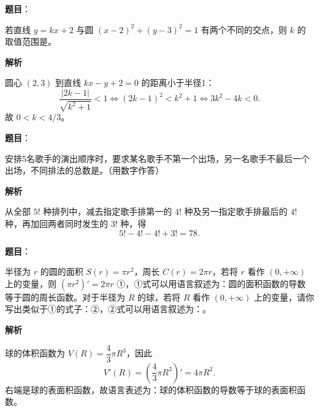 \begin{answer}

\textbf{题目}：

若直线 $y=kx+2$ 与圆 $(x-2)^2+(y-3)^2=1$ 有两个不同的交点，则 $k$ 的取值范围是\gkblank{}。

\textbf{解析}

圆心 $(2,3)$ 到直线 $kx-y+2=0$ 的距离小于半径1：
\nopagebreak[4]
\[
\frac{|2k-1|}{\sqrt{k^2+1}}<1
\iff (2k-1)^2<k^2+1
\iff 3k^2-4k<0.
\]
故 $0<k<4/3$。


\end{answer}
\begin{answer}

\textbf{题目}：

安排5名歌手的演出顺序时，要求某名歌手不第一个出场，另一名歌手不最后一个出场，不同排法的总数是\gkblank{}。（用数字作答）

\textbf{解析}

从全部 $5!$ 种排列中，减去指定歌手排第一的 $4!$ 种及另一指定歌手排最后的 $4!$ 种，再加回两者同时发生的 $3!$ 种，得
\nopagebreak[4]
\[
5!-4!-4!+3!=78.
\]


\end{answer}
\begin{answer}

\textbf{题目}：

半径为 $r$ 的圆的面积 $S(r)=\pi r^2$，周长 $C(r)=2\pi r$，若将 $r$ 看作 $(0,+\infty)$ 上的变量，则 $(\pi r^2)'=2\pi r$ ①，①式可以用语言叙述为：圆的面积函数的导数等于圆的周长函数。对于半径为 $R$ 的球，若将 $R$ 看作 $(0,+\infty)$ 上的变量，请你写出类似于①的式子：\gkblank{}②，②式可以用语言叙述为：\gkblank{}。

\textbf{解析}

球的体积函数为 $V(R)=\dfrac43\pi R^3$，因此
\nopagebreak[4]
\[
V'(R)=\left(\frac43\pi R^3\right)'=4\pi R^2.
\]
右端是球的表面积函数，故语言表述为：球的体积函数的导数等于球的表面积函数。


\end{answer}
